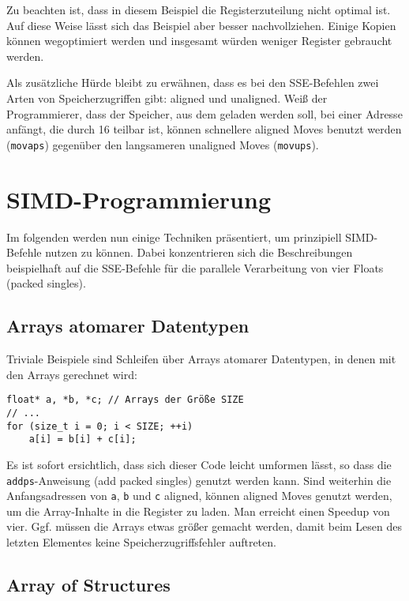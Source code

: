\documentclass[a4paper,10pt]{article}
\begin{document}
Zu beachten ist, dass in diesem Beispiel die Registerzuteilung nicht optimal ist. Auf diese Weise
lässt sich das Beispiel aber besser nachvollziehen. Einige Kopien können wegoptimiert werden
und insgesamt würden weniger Register gebraucht werden.

Als zusätzliche Hürde bleibt zu erwähnen, dass es bei den SSE-Befehlen zwei Arten von
Speicherzugriffen gibt: aligned und unaligned. Weiß der Programmierer, dass der Speicher, aus dem
geladen werden soll, bei einer Adresse anfängt, die durch 16 teilbar ist, können schnellere aligned
Moves benutzt werden (\texttt{movaps}) gegenüber den langsameren unaligned Moves (\texttt{movups}).

\newpage
\section{SIMD-Programmierung}

Im folgenden werden nun einige Techniken präsentiert, um prinzipiell SIMD-Befehle nutzen zu können.
Dabei konzentrieren sich die Beschreibungen beispielhaft auf die SSE-Befehle für die parallele
Verarbeitung von vier Floats (packed singles). 

\subsection{Arrays atomarer Datentypen}

Triviale Beispiele sind Schleifen über Arrays atomarer Datentypen, in denen mit den Arrays
gerechnet wird:

\begin{verbatim}
float* a, *b, *c; // Arrays der Größe SIZE
// ...
for (size_t i = 0; i < SIZE; ++i)
    a[i] = b[i] + c[i];
\end{verbatim}

Es ist sofort ersichtlich, dass sich dieser Code leicht umformen lässt, so dass die
\texttt{addps}-Anweisung (add packed singles) genutzt werden kann. Sind weiterhin die
Anfangsadressen von \texttt{a}, \texttt{b} und \texttt{c} aligned, können aligned Moves genutzt
werden, um die Array-Inhalte in die Register zu laden. Man erreicht einen Speedup von vier. Ggf.
müssen die Arrays etwas größer gemacht werden, damit beim Lesen des letzten Elementes keine
Speicherzugriffsfehler auftreten.

\subsection{Array of Structures}
\end{document}

